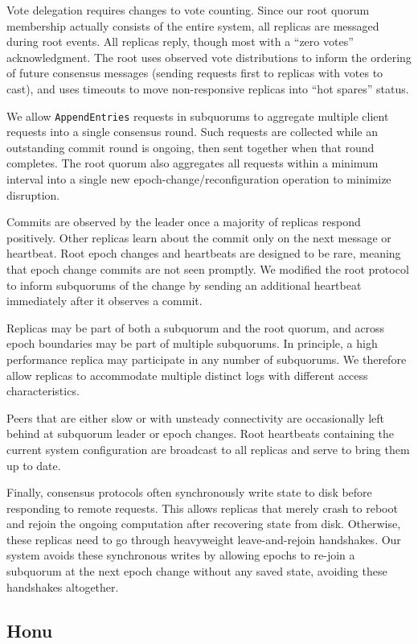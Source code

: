 Vote delegation requires changes to vote counting.
Since our root quorum membership actually consists of the entire system, all replicas
are messaged during root events.
All replicas reply, though most with a ``zero votes'' acknowledgment.
The root uses observed vote distributions to inform the ordering of future
consensus messages (sending requests first to replicas with votes to cast),
and uses timeouts to move non-responsive replicas into ``hot spares'' status.

We allow \texttt{AppendEntries} requests in subquorums to aggregate multiple client
requests into a single consensus round.
Such requests are collected while an outstanding commit round is ongoing, then
sent together when that round completes.
The root quorum also aggregates all requests within a minimum interval into a single
new epoch-change/reconfiguration operation to minimize disruption.

Commits are observed by the leader once a majority of replicas respond
positively.
Other replicas learn about the commit only on the next message or heartbeat.
Root epoch changes and heartbeats are designed to be rare, meaning that epoch
change commits are not seen promptly.
We modified the root protocol to inform subquorums of the change by sending an
additional heartbeat immediately after it observes a commit.

Replicas may be part of both a subquorum and the root quorum, and across epoch boundaries
may be part of multiple subquorums.
In principle, a high performance replica may participate in any number of
subquorums.
We therefore allow replicas to accommodate multiple distinct logs with
different access characteristics.

Peers that are either slow or with unsteady connectivity are occasionally left
behind at subquorum leader or epoch changes.
Root heartbeats containing the current system configuration are broadcast to
all replicas and serve to bring them up to date.

Finally, consensus protocols often synchronously write state to disk before
responding to remote requests.
This allows replicas that merely crash to reboot and rejoin the ongoing
computation after recovering state from disk.
Otherwise, these replicas need to go through heavyweight leave-and-rejoin
handshakes.
Our system avoids these synchronous writes by allowing epochs to re-join a
subquorum at the next epoch change without any saved state, avoiding these
handshakes altogether.

\subsection{Honu}
\label{ch05_honu}

